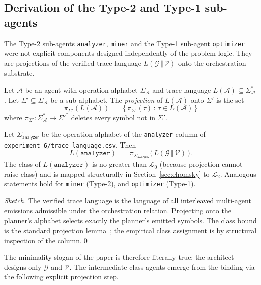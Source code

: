 \subsection{Derivation of the Type-2 and Type-1 sub-agents}

The Type-2 sub-agents \texttt{analyzer},
\texttt{miner} and the Type-1 sub-agent
\texttt{optimizer} were not explicit components
designed independently of the problem logic.  They are projections
of the verified trace language
$L(\mathcal{G}\,\Vert\,\mathcal{V})$ onto the orchestration
substrate.

\begin{definition}
\label{def:projection}
Let $\mathcal{A}$ be an agent with operation alphabet
$\Sigma_\mathcal{A}$ and trace language $L(\mathcal{A})\subseteq
\Sigma_\mathcal{A}^*$.  Let $\Sigma' \subseteq
\Sigma_\mathcal{A}$ be a sub-alphabet.  The \emph{projection}
of $L(\mathcal{A})$ onto $\Sigma'$ is the set
\[
\pi_{\Sigma'}(L(\mathcal{A})) \;=\;
\{\,\pi_{\Sigma'}(\tau) \,:\, \tau\in L(\mathcal{A})\,\}
\]
where $\pi_{\Sigma'}: \Sigma_\mathcal{A}^*\to{\Sigma'}^*$
deletes every symbol not in $\Sigma'$.
\end{definition}

\begin{theorem}
\label{thm:derived}
Let $\Sigma_{\textsf{analyzer}}$ be the operation alphabet of the
\texttt{analyzer} column of \texttt{experiment\_6/trace\_language.csv}.
Then
\[
L(\texttt{analyzer}) \;=\;
\pi_{\Sigma_{\textsf{analyzer}}}\bigl(\,L(\mathcal{G}\,\Vert\,\mathcal{V})\,
\bigr).
\]
The class of $L(\texttt{analyzer})$ is no greater than
$\mathcal{L}_0$ (because projection cannot raise class) and is
mapped structurally in Section~\ref{sec:chomsky} to
$\mathcal{L}_2$.  Analogous statements hold for
\texttt{miner} (Type-2),
and \texttt{optimizer} (Type-1).
\end{theorem}

\begin{proof}[Sketch]
The verified trace language is the language of all interleaved
multi-agent emissions admissible under the orchestration
relation.  Projecting onto the planner's alphabet selects exactly
the planner's emitted symbols.  The class bound is the standard
projection lemma~\cite{hopcroft2006automata}; the empirical
class assignment is by structural inspection of the column.\qed
\end{proof}

The minimality slogan of the paper is therefore literally true:
the architect designs only $\mathcal{G}$ and $\mathcal{V}$.  The
intermediate-class agents emerge from the binding via the
following explicit projection step.

